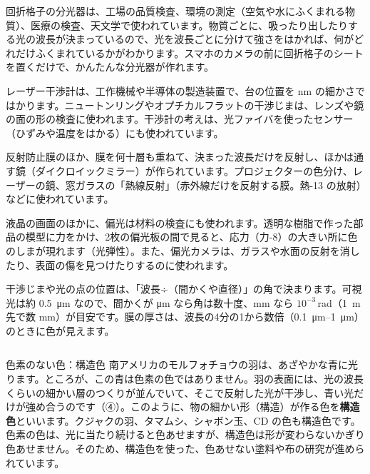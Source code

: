 \begin{phkougaku}
回折格子の分光器は、工場の品質検査、環境の測定（空気や水にふくまれる物質）、医療の検査、天文学で使われています。物質ごとに、吸ったり出したりする光の波長が決まっているので、光を波長ごとに分けて強さをはかれば、何がどれだけふくまれているかがわかります。スマホのカメラの前に回折格子のシートを置くだけで、かんたんな分光器が作れます。

レーザー干渉計は、工作機械や半導体の製造装置で、台の位置を \unit{nm} の細かさではかります。ニュートンリングやオプチカルフラットの干渉じまは、レンズや鏡の面の形の検査に使われます。干渉計の考えは、光ファイバを使ったセンサー（ひずみや温度をはかる）にも使われています。

反射防止膜のほか、膜を何十層も重ねて、決まった波長だけを反射し、ほかは通す鏡（ダイクロイックミラー）が作られています。プロジェクターの色分け、レーザーの鏡、窓ガラスの「熱線反射」（赤外線だけを反射する膜。熱-13 の放射）などに使われています。

液晶の画面のほかに、偏光は材料の検査にも使われます。透明な樹脂で作った部品の模型に力をかけ、2枚の偏光板の間で見ると、応力（力-8）の大きい所に色のしまが現れます（光弾性）。また、偏光カメラは、ガラスや水面の反射を消したり、表面の傷を見つけたりするのに使われます。

\begin{phketa}[光の波の数]
干渉じまや光の点の位置は、「波長÷（間かくや直径）」の角で決まります。可視光は約 \qty{0.5}{\micro m} なので、間かくが \unit{\micro m} なら角は数十度、\unit{mm} なら $10^{-3}$\,rad（\qty{1}{m} 先で数 mm）が目安です。膜の厚さは、波長の4分の1から数倍（\qtyrange{0.1}{1}{\micro m}）のときに色が見えます。
\end{phketa}
\end{phkougaku}

\begin{column}{色素のない色：構造色}
南アメリカのモルフォチョウの羽は、あざやかな青に光ります。ところが、この青は色素の色ではありません。羽の表面には、光の波長くらいの細かい層のつくりが並んでいて、そこで反射した光が干渉し、青い光だけが強め合うのです（④）。このように、物の細かい形（構造）が作る色を\textbf{構造色}といいます。クジャクの羽、タマムシ、シャボン玉、CD の色も構造色です。色素の色は、光に当たり続けると色あせますが、構造色は形が変わらないかぎり色あせません。そのため、構造色を使った、色あせない塗料や布の研究が進められています。
\end{column}


